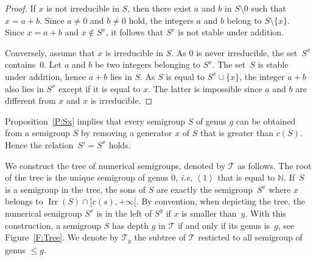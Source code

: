 \documentclass[reqno,11pt]{amsart}
\theoremstyle{plain}
\theoremstyle{definition}
\newcommand{\ie}{\emph{i.e.}}
\renewcommand{\leq}{\leqslant}
\newcommand{\NN}{\mathbb{N}}
\renewcommand{\ie}{\emph{i.e}}
\DeclareMathOperator{\Irr}{Irr}
\begin{document}
\begin{proof}
If $x$ is not irreducible in  $S$, then there exist $a$ and $b$ in $S\setminus{0}$ such that $x=a+b$. 
Since $a\not=0$ and $b\not=0$ hold, the integers  $a$ and $b$ belong to $S\setminus\{x\}$. 
Since $x=a+b$ and $x\not\in S^x$, it follows that  $S^x$ is not stable under addition. 

Conversely, assume that $x$ is irreducible in  $S$. 
As $0$ is never irreducible, the set~$S^x$ contains~$0$. 
Let $a$ and $b$ be two integers belonging to $S^x$. 
The set~$S$ is stable under addition, hence $a+b$ lies in $S$. 
As $S$ is equal to $S^x\cup\{x\}$, the integer $a+b$ also lies in $S^x$ except if it is equal to $x$. 
The latter is impossible since $a$ and $b$ are different from $x$ and $x$ is irreducible.
\end{proof}

Proposition~\ref{P:Sx} implies that every semigroup $S$ of genus $g$ can be obtained from a semigroup $S$ by removing a generator $x$ of $S$ that is greater than $c(S)$.
Hence the relation~$S'=S^x$ holds.

We construct the tree of numerical semigroups, denoted by $\mathcal{T}$ as follows. 
The root of the tree is the unique semigroup of genus $0$, \ie, $\left<1\right>$ that is equal to $\NN$. 
If~$S$ is a semigroup in the tree,  the sons of $S$ are exactly the semigroup~$S^x$ where $x$ belongs to $\Irr(S)\cap[c(s),+\infty[$. 
By convention, when depicting the tree, the numerical semigroup $S^x$ is in the left of $S^y$ if $x$ is smaller than~$y$. 
With this construction, a semigroup $S$ has depth $g$ in $\mathcal{T}$ if and only if its genus is~$g$, see Figure~\ref{F:Tree}.
We denote by $\mathcal{T}_{g}$ the subtree of $\mathcal{T}$ resticted to all semigroup of genus $\leq g$.

\vspace{-3em}
\end{document}
